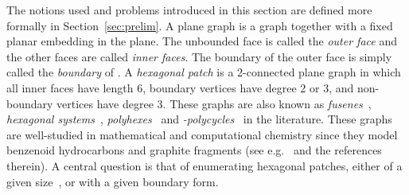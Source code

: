 \documentclass{llncs}
\begin{document}
The notions used and problems introduced in this section are defined more formally in Section~\ref{sec:prelim}.
A plane graph  is a graph together with a fixed planar embedding in the plane. The unbounded face is called the {\em outer face} and the other faces are called {\em inner faces}. The boundary of the outer face is simply called the {\em boundary} of .
A {\em hexagonal patch} is a 2-connected plane graph in which all inner faces have length 6, boundary vertices have degree 2 or 3, and non-boundary vertices have degree 3. These graphs are also known as {\em fusenes}~\cite{GHZ02}, {\em hexagonal systems}~\cite{DFG01}, {\em polyhexes}~\cite{Gra03} and {\em -polycycles}~\cite{DDS08} in the literature. These graphs are well-studied in mathematical and computational chemistry since they model benzenoid hydrocarbons and graphite fragments (see e.g.~\cite{GHZ02} and the references therein). A central question is that of enumerating hexagonal patches, either of a given size~\cite{BCH03}, or with a given boundary form.
\end{document}
